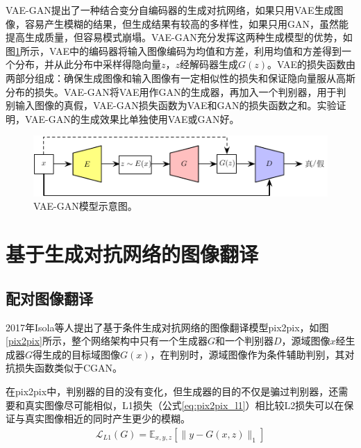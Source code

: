 VAE-GAN\cite{larsen2016autoencoding}提出了一种结合变分自编码器的生成对抗网络，如果只用VAE\cite{kingma2013auto}生成图像，容易产生模糊的结果，但生成结果有较高的多样性，如果只用GAN\cite{goodfellow2014generative}，虽然能提高生成质量，但容易模式崩塌。VAE-GAN充分发挥这两种生成模型的优势，如图\ref{VAE-GAN}所示，VAE中的编码器将输入图像编码为均值和方差，利用均值和方差得到一个分布，并从此分布中采样得隐向量$z$，$z$经解码器生成$G(z)$。VAE的损失函数由两部分组成：确保生成图像和输入图像有一定相似性的损失和保证隐向量服从高斯分布的损失。VAE-GAN将VAE用作GAN的生成器，再加入一个判别器，用于判别输入图像的真假，VAE-GAN损失函数为VAE和GAN的损失函数之和。实验证明，VAE-GAN的生成效果比单独使用VAE或GAN好。

\begin{figure}[ht]
    \centering
	\includegraphics[width=\textwidth]{figs/VAEGAN.pdf}
	\caption{VAE-GAN模型示意图\cite{larsen2016autoencoding}。}
	\label{VAE-GAN}
\end{figure}

\section{基于生成对抗网络的图像翻译}

\subsection{配对图像翻译}
2017年Isola等人\cite{isola2017image}提出了基于条件生成对抗网络的图像翻译模型pix2pix，如图\ref{pix2pix}所示，整个网络架构中只有一个生成器$G$和一个判别器$D$，源域图像$x$经生成器$G$得生成的目标域图像$G(x)$，在判别时，源域图像作为条件辅助判别，其对抗损失函数类似于CGAN。

在pix2pix中，判别器的目的没有变化，但生成器的目的不仅是骗过判别器，还需要和真实图像尽可能相似，L1损失\cite{isola2017image}\cite{shrivastava2017learning}（公式\ref{eq:pix2pix_l1}）相比较L2损失\cite{pathak2016context}可以在保证与真实图像相近的同时产生更少的模糊。
\begin{equation}
\begin{split}
\mathcal{L}_{L1}(G) = \mathbb{E}_{x,y,z}[\parallel y-G(x,z)\parallel_1]
\end{split}
\label{eq:pix2pix_l1}
\end{equation}

